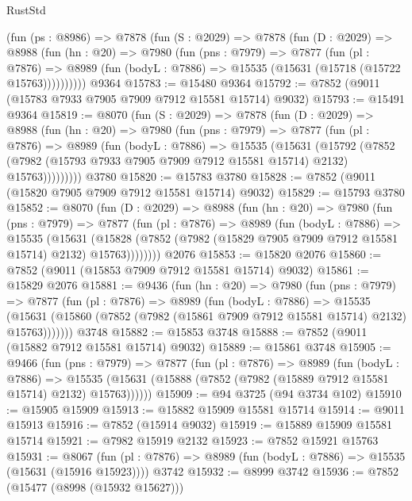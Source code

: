 \begin{lexlean}{RustStd}
\begin{coremodule}
    (fun (ps : @8986) =>
    @7878
      (fun (S : @2029) =>
      @7878
        (fun (D : @2029) =>
        @8988
          (fun (hn : @20) =>
          @7980
            (fun (pns : @7979) =>
            @7877
              (fun (pl : @7876) =>
              @8989 (fun (bodyL : @7886) => @15535 (@15631 (@15718 (@15722 @15763))))))))))
    @9364
@15783 := @15480 @9364
@15792 := @7852 (@9011 (@15783 @7933 @7905 @7909 @7912 @15581 @15714) @9032)
@15793 := @15491 @9364
@15819 := @8070
    (fun (S : @2029) =>
    @7878
      (fun (D : @2029) =>
      @8988
        (fun (hn : @20) =>
        @7980
          (fun (pns : @7979) =>
          @7877
            (fun (pl : @7876) =>
            @8989
              (fun (bodyL : @7886) =>
              @15535
                (@15631
                  (@15792
                    (@7852
                      (@7982 (@15793 @7933 @7905 @7909 @7912 @15581 @15714) @2132)
                      @15763)))))))))
    @3780
@15820 := @15783 @3780
@15828 := @7852 (@9011 (@15820 @7905 @7909 @7912 @15581 @15714) @9032)
@15829 := @15793 @3780
@15852 := @8070
    (fun (D : @2029) =>
    @8988
      (fun (hn : @20) =>
      @7980
        (fun (pns : @7979) =>
        @7877
          (fun (pl : @7876) =>
          @8989
            (fun (bodyL : @7886) =>
            @15535
              (@15631
                (@15828 (@7852 (@7982 (@15829 @7905 @7909 @7912 @15581 @15714) @2132) @15763))))))))
    @2076
@15853 := @15820 @2076
@15860 := @7852 (@9011 (@15853 @7909 @7912 @15581 @15714) @9032)
@15861 := @15829 @2076
@15881 := @9436
    (fun (hn : @20) =>
    @7980
      (fun (pns : @7979) =>
      @7877
        (fun (pl : @7876) =>
        @8989
          (fun (bodyL : @7886) =>
          @15535
            (@15631 (@15860 (@7852 (@7982 (@15861 @7909 @7912 @15581 @15714) @2132) @15763)))))))
    @3748
@15882 := @15853 @3748
@15888 := @7852 (@9011 (@15882 @7912 @15581 @15714) @9032)
@15889 := @15861 @3748
@15905 := @9466
    (fun (pns : @7979) =>
    @7877
      (fun (pl : @7876) =>
      @8989
        (fun (bodyL : @7886) =>
        @15535 (@15631 (@15888 (@7852 (@7982 (@15889 @7912 @15581 @15714) @2132) @15763))))))
@15909 := @94 @3725 (@94 @3734 @102)
@15910 := @15905 @15909
@15913 := @15882 @15909 @15581 @15714
@15914 := @9011 @15913
@15916 := @7852 (@15914 @9032)
@15919 := @15889 @15909 @15581 @15714
@15921 := @7982 @15919 @2132
@15923 := @7852 @15921 @15763
@15931 := @8067
    (fun (pl : @7876) => @8989 (fun (bodyL : @7886) => @15535 (@15631 (@15916 @15923))))
    @3742
@15932 := @8999 @3742
@15936 := @7852 (@15477 (@8998 (@15932 @15627)))

\end{coremodule}
\end{lexlean}
